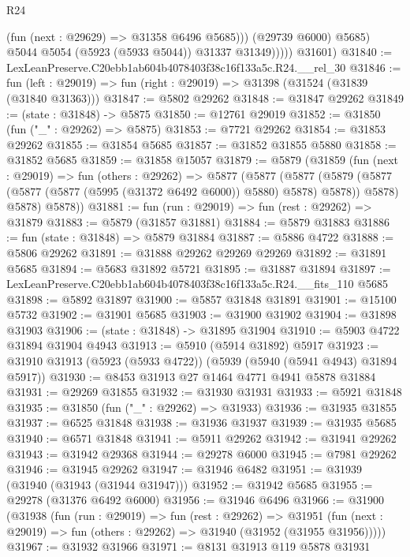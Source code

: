 \begin{lexlean}{R24}
\begin{coremodule}
                      (fun (next : @29629) => @31358 @6496 @5685)))
                  (@29739 @6000)
                  @5685)
                @5044
                @5054
                (@5923 (@5933 @5044))
                @31337
                @31349)))))
      @31601)
@31840 := LexLeanPreserve.C20ebb1ab604b4078403f38c16f133a5c.R24.__rel_30
@31846 := fun (left : @29019) => fun (right : @29019) => @31398 (@31524 (@31839 (@31840 @31363)))
@31847 := @5802 @29262
@31848 := @31847 @29262
@31849 := (state : @31848) -> @5875
@31850 := @12761 @29019
@31852 := @31850 (fun ("_" : @29262) => @5875)
@31853 := @7721 @29262
@31854 := @31853 @29262
@31855 := @31854 @5685
@31857 := @31852 @31855 @5880
@31858 := @31852 @5685
@31859 := @31858 @15057
@31879 := @5879
    (@31859
      (fun (next : @29019) =>
      fun (others : @29262) =>
      @5877
        (@5877
          (@5877
            (@5879 (@5877 (@5877 (@5877 (@5995 (@31372 @6492 @6000)) @5880) @5878) @5878))
            @5878)
          @5878)
        @5878))
@31881 := fun (run : @29019) => fun (rest : @29262) => @31879
@31883 := @5879 (@31857 @31881)
@31884 := @5879 @31883
@31886 := fun (state : @31848) => @5879 @31884
@31887 := @5886 @4722
@31888 := @5806 @29262
@31891 := @31888 @29262 @29269 @29269
@31892 := @31891 @5685
@31894 := @5683 @31892 @5721
@31895 := @31887 @31894
@31897 := LexLeanPreserve.C20ebb1ab604b4078403f38c16f133a5c.R24.__fits_110 @5685
@31898 := @5892 @31897
@31900 := @5857 @31848 @31891
@31901 := @15100 @5732
@31902 := @31901 @5685
@31903 := @31900 @31902
@31904 := @31898 @31903
@31906 := (state : @31848) -> @31895 @31904
@31910 := @5903 @4722 @31894 @31904 @4943
@31913 := @5910 (@5914 @31892) @5917
@31923 := @31910 @31913 (@5923 (@5933 @4722)) (@5939 (@5940 (@5941 @4943) @31894 @5917))
@31930 := @8453 @31913 @27 @1464 @4771 @4941 @5878 @31884
@31931 := @29269 @31855
@31932 := @31930 @31931
@31933 := @5921 @31848
@31935 := @31850 (fun ("_" : @29262) => @31933)
@31936 := @31935 @31855
@31937 := @6525 @31848
@31938 := @31936 @31937
@31939 := @31935 @5685
@31940 := @6571 @31848
@31941 := @5911 @29262
@31942 := @31941 @29262
@31943 := @31942 @29368
@31944 := @29278 @6000
@31945 := @7981 @29262
@31946 := @31945 @29262
@31947 := @31946 @6482
@31951 := @31939 (@31940 (@31943 (@31944 @31947)))
@31952 := @31942 @5685
@31955 := @29278 (@31376 @6492 @6000)
@31956 := @31946 @6496
@31966 := @31900
    (@31938
      (fun (run : @29019) =>
      fun (rest : @29262) =>
      @31951 (fun (next : @29019) => fun (others : @29262) => @31940 (@31952 (@31955 @31956)))))
@31967 := @31932 @31966
@31971 := @8131 @31913 @119 @5878 @31931

\end{coremodule}
\end{lexlean}
